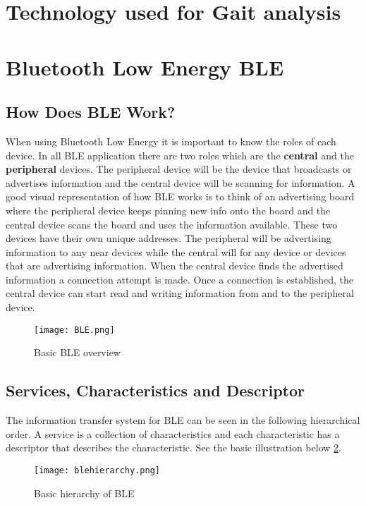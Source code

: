 \newpage
\section{Technology used for Gait analysis}

\section{Bluetooth Low Energy BLE}
\label{sec:ble}

\subsection{How Does BLE Work?}
\label{sec:howdoesblework}

When using Bluetooth Low Energy it is important to know the roles of each device. In all BLE application there are two roles which are the \textbf{central} and the \textbf{peripheral} devices. The peripheral device will be the device that broadcasts or advertises information and the central device will be scanning for information. A good visual representation of how BLE works is to think of an advertising board where the peripheral device keeps pinning new info onto the board and the central device scans the board and uses the information available. These two devices have their own unique addresses. The peripheral will be advertising information to any near devices while the central will for any device or devices that are advertising information. When the central device finds the advertised information a connection attempt is made. Once a connection is established, the central device can start read and writing information from and to the peripheral device.
\begin{figure}[!h]
    \centering
    \texttt{[image: BLE.png]}
    \caption{Basic BLE overview}
    \label{fig:bleoverview}
\end{figure}


\subsection{Services, Characteristics and Descriptor}
\label{sec:servicesandcharacteristics}
 The information transfer system for BLE can be seen in the following hierarchical order. A service is a collection of characteristics and each characteristic has a descriptor that describes the characteristic. See the basic illustration below \ref{fig:ble_roles}.

\begin{figure}[!h]
    \centering
    \texttt{[image: blehierarchy.png]}
    \caption{Basic hierarchy of BLE}
    \label{fig:ble_roles}
\end{figure}

